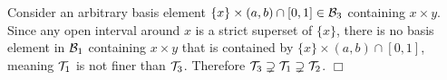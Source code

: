 \documentclass{article}
\begin{document}
\begin{enumerate}
        Consider an arbitrary basis element $\{x \} \times (a, b) \cap [0, 1] \in \mathcal{B}_3$ containing $x \times y$. Since any open interval around $x$ is a strict superset of $\{x\}$, there is no basis element in $\mathcal{B}_1$ containing $x\times y$ that is contained by $\{x\} \times (a, b) \cap [0, 1]$, meaning $\mathcal{T}_1$ is not finer than $\mathcal{T}_3$. Therefore $\mathcal{T}_3 \supsetneq \mathcal{T}_1 \supsetneq \mathcal{T}_2$. $\Box$
\end{enumerate}
\end{document}
